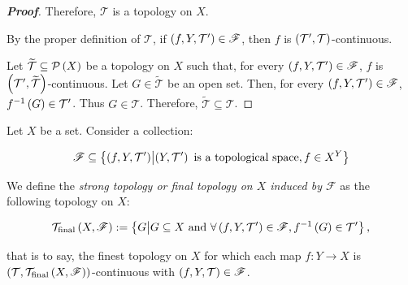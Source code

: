 \begin{proposition}
\begin{proof}[\rm\textbf{Proof}]
    Therefore, $\mathcal{T}$ is a topology on $X$.

    By the proper definition of $\mathcal{T}$, if $\left(f,Y,\mathcal{T}'\right)\in\mathscr{F}$, then $f$ is $\left(\mathcal{T}',\mathcal{T}\right)$-continuous.

    Let $\widetilde{\mathcal{T}}\subseteq\mathcal{P}\left(X\right)$ be a topology on $X$ such that, for every $\left(f,Y,\mathcal{T}'\right)\in\mathscr{F}$, $f$ is $\left(\mathcal{T}',\widetilde{\mathcal{T}}\right)$-continuous. Let $G\in\widetilde{\mathcal{T}}$ be an open set. Then, for every $\left(f,Y,\mathcal{T}'\right)\in\mathscr{F}$, $f^{-1}\left(G\right)\in\mathcal{T}'$. Thus $G\in\mathcal{T}$. Therefore, $\widetilde{\mathcal{T}}\subseteq\mathcal{T}$.
  \end{proof}
\end{proposition}

\begin{definition}
  Let $X$ be a set. Consider a collection:
  
  \begin{equation}
    \mathscr{F}\subseteq\left\{\left(f,Y,\mathcal{T}'\right)\middle|\left(Y,\mathcal{T}'\right)\text{ is a topological space}, f\in X^Y\right\}
  \end{equation}
  
  We define the \textit{strong topology or final topology on $X$ induced by $\mathscr{F}$} as the following topology on $X$:

  \begin{equation}
    \mathcal{T}_{\text{final}}\left(X,\mathscr{F}\right):=\left\{G\middle|G\subseteq X\text{ and }\forall\left(f,Y,\mathcal{T}'\right)\in\mathscr{F},f^{-1}\left(G\right)\in\mathcal{T}'\right\},
  \end{equation}

  that is to say, the finest topology on $X$ for which each map $f:Y\rightarrow X$ is $\left(\mathcal{T},\mathcal{T}_{\text{final}}\left(X,\mathscr{F}\right)\right)$-continuous with $\left(f,Y,\mathcal{T}\right)\in\mathscr{F}$.
\end{definition}

